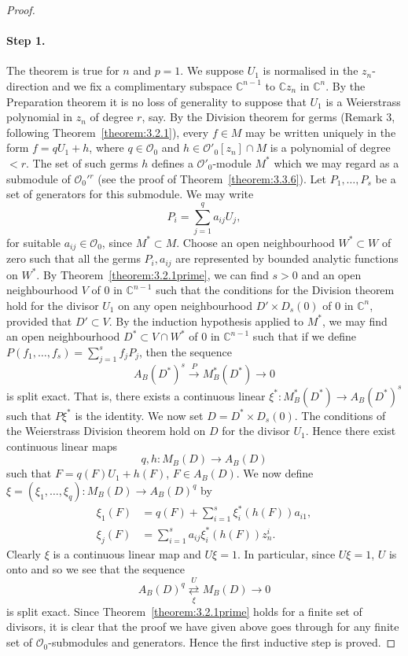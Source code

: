 \begin{proof}
\paragraph*{Step 1.} The theorem is true for $n$ and $p=1$. We suppose $U_1$ is normalised in the $z_n$-direction and we fix a complimentary subspace $\mathbb C^{n-1}$ to $\mathbb Cz_n$ in $\mathbb C^n$. By the Preparation theorem it is no loss of generality to suppose that $U_1$ is a Weierstrass polynomial in $z_n$ of degree $r$, say. By the Division theorem for germs (Remark 3, following Theorem~\ref{theorem:3.2.1}), every $f\in M$ may be written uniquely in the form $f=qU_1+h$, where $q\in\mathcal O_0$ and $h\in\mathcal O'_0[z_n]\cap M$ is a polynomial of degree $<r$. The set of such germs $h$ defines a $\mathcal O'_0$-module $M^*$ which we may regard as a submodule of $\mathcal O_0'{}^r$ (see the proof of Theorem~\ref{theorem:3.3.6}). Let $P_1,\ldots,P_s$ be a set of generators for this submodule. We may write
\[P_i=\sum_{j=1}^q a_{ij}U_j,\]
for suitable $a_{ij}\in\mathcal O_0$, since $M^*\subset M$. Choose an open neighbourhood $W^*\subset W$ of zero such that all the germs $P_i,a_{ij}$ are represented by bounded analytic functions on $W^*$. By Theorem~\ref{theorem:3.2.1prime}, we can find $s>0$ and an open neighbourhood $V$ of $0$ in $\mathbb C^{n-1}$ such that the conditions for the Division theorem hold for the divisor $U_1$ on any open neighbourhood $D'\times D_s(0)$ of $0$ in $\mathbb C^n$, provided that $D'\subset V$. By the induction hypothesis applied to $M^*$, we may find an open neighbourhood $D^*\subset V\cap W^*$ of $0$ in $\mathbb C^{n-1}$ such that if we define $P(f_1,\ldots,f_s)=\sum_{j=1}^s f_jP_j$, then the sequence
\[A_B(D^*)^s\xrightarrow{P}M_B^*(D^*)\to0\]
is split exact. That is, there exists a continuous linear $\xi^*:M_B^*(D^*)\to A_B(D^*)^s$ such that $P\xi^*$ is the identity. We now set $D=D^*\times D_s(0)$. The conditions of the Weierstrass Division theorem hold on $D$ for the divisor $U_1$. Hence there exist continuous linear maps
\[q,h:M_B(D)\to A_B(D)\]
such that $F=q(F)U_1+h(F)$, $F\in A_B(D)$. We now define $\xi=(\xi_1,\ldots,\xi_q):M_B(D)\to A_B(D)^q$ by
\begin{align*}
\xi_1(F)&=q(F)+\sum_{i=1}^s\xi_i^*(h(F))a_{i1},\\
\xi_j(F)&=\sum_{i=1}^s a_{ij}\xi_i^*(h(F))z_n^i.
\end{align*}
Clearly $\xi$ is a continuous linear map and $U\xi=1$. In particular, since $U\xi=1$, $U$ is onto and so we see that the sequence
\[A_B(D)^q\mathrel{\mathop{\rightleftarrows}\limits^{U}_{\xi}}M_B(D)\to0\]
is split exact. Since Theorem~\ref{theorem:3.2.1prime} holds for a finite set of divisors, it is clear that the proof we have given above goes through for any finite set of $\mathcal O_0$-submodules and generators. Hence the first inductive step is proved.

\end{proof}
